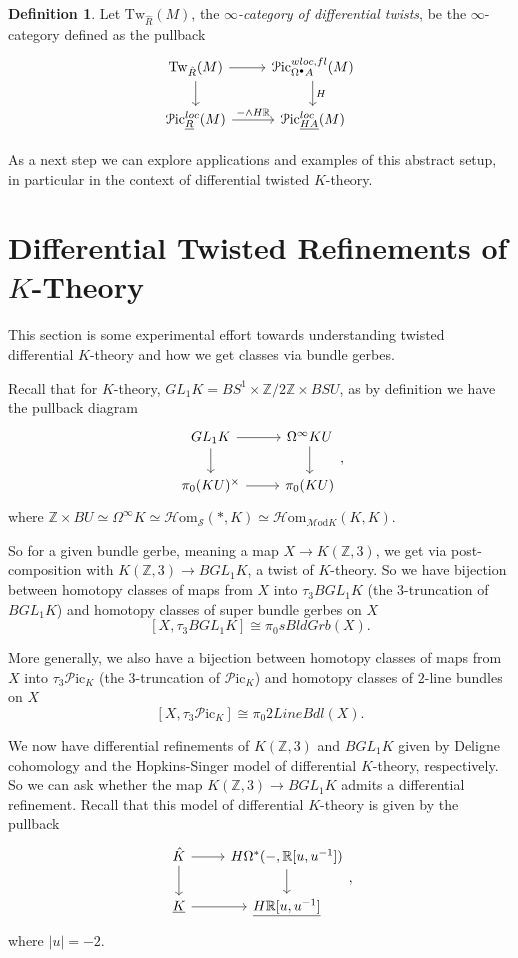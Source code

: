 \documentclass[a4paper]{book}
\newcommand{\lH}{\mathcal{H}}
\newcommand{\lM}{\mathcal{M}}
\newcommand{\lP}{\mathcal{P}}
\newcommand{\bR}{\mathbb{R}}
\newcommand{\lS}{\mathcal{S}}
\newcommand{\bZ}{\mathbb{Z}}
\newcommand{\Hom}{\lH\mathrm{om}} %
\newcommand{\Mod}{\lM\mathrm{od}} %
\newcommand{\Pic}{\lP\mathrm{ic}} %
\theoremstyle{definition}
\newtheorem{definition}[equation]{Definition}
\theoremstyle{remark}
\numberwithin{equation}{section}
\begin{document}
\begin{definition}
  Let $\mathrm{Tw}_{\hat{R}}(M)$, the \emph{$\infty$-category of differential twists}, be the $\infty$-category defined as the pullback
  \[
  \begin{tikzcd}
    \mathrm{Tw}_{\hat{R}}(M) \arrow[r] \arrow[d] & \Pic^{wloc, fl}_{\Omega^\bullet A}(M) \arrow[d, "H"] \\
    \Pic^{loc}_{\underline{R}}(M) \arrow[r, " - \wedge H\bR"] & \Pic^{loc}_{\underline{HA}}(M)
  \end{tikzcd}
  \]
\end{definition}

As a next step we can explore applications and examples of this abstract setup, in particular in the context of differential twisted $K$-theory.

\section{Differential Twisted Refinements of \texorpdfstring{$K$}{K}-Theory}
This section is some experimental effort towards understanding twisted differential $K$-theory and how we get classes via bundle gerbes.

Recall that for $K$-theory, $GL_1K = BS^1 \times \bZ/2\bZ \times BSU$, as by definition we have the pullback diagram 
\[ 
\begin{tikzcd}
 GL_1K \arrow[r] \arrow[d] & \Omega^\infty KU \arrow[d] \\
 \pi_0(KU)^\times \arrow[r] & \pi_0(KU)
\end{tikzcd},
\]
where $\bZ \times BU \simeq \Omega^\infty K \simeq \Hom_{\lS}(*, K) \simeq \Hom_{\Mod K}(K,K)$.

So for a given bundle gerbe, meaning a map $X \to K(\bZ,3)$, we get via post-composition with $K(\bZ,3) \to BGL_1K$, a twist of $K$-theory. So we have bijection between homotopy classes of maps from $X$ into $\tau_3 BGL_1 K$ (the $3$-truncation of $BGL_1K$) and homotopy classes of super bundle gerbes on $X$
\[[X, \tau_3 BGL_1 K] \cong \pi_0 sBldGrb(X).\]

More generally, we also have a bijection between homotopy classes of maps from $X$ into $\tau_3\Pic_K$ (the $3$-truncation of $\Pic_K$) and homotopy classes of $2$-line bundles on $X$
\[[X, \tau_3\Pic_K] \cong \pi_0 2LineBdl(X).\]

We now have differential refinements of $K(\bZ,3)$ and $BGL_1K$ given by Deligne cohomology and the Hopkins-Singer model of differential $K$-theory, respectively. So we can ask whether the map $K(\bZ,3) \to BGL_1K$ admits a differential refinement. Recall that this model of differential $K$-theory is given by the pullback
\[ 
\begin{tikzcd}
 \hat{K} \arrow[r] \arrow[d] & H\Omega^*(-, \bR[u,u^{-1}]) \arrow[d] \\
 \underline{K} \arrow[r] & \underline{H\bR[u,u^{-1}]} 
\end{tikzcd},
\]
where $|u| = -2$.
\end{document}
